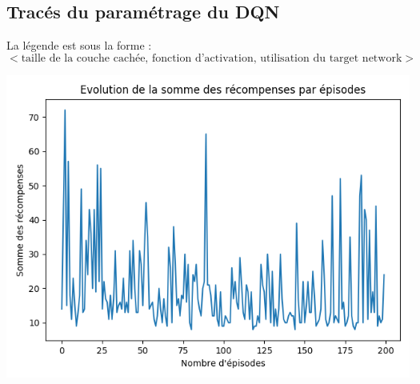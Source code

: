 \documentclass[10pt,a4paper]{article}
\begin{document}
\subsection{Tracés du paramétrage du DQN} \label{graphDQN}

La légende est sous la forme :
$$ < \text{taille de la couche cachée, fonction d'activation, utilisation du target network} >$$

\begin{center}
	\includegraphics[scale=0.3]{../performances/tarnetRelu24.png}
\end{center}
\end{document}
